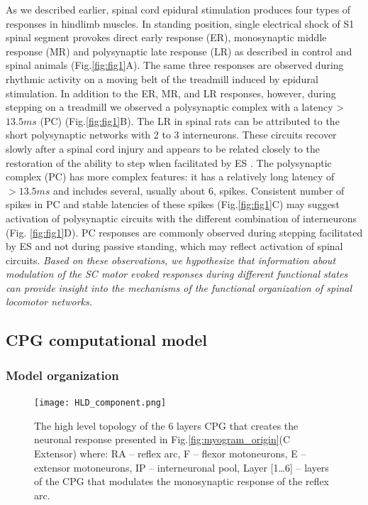 \documentclass[]{elsarticle}
\begin{document}
As we described earlier, spinal cord epidural stimulation produces four types of responses in hindlimb muscles. In standing position, single electrical shock of S1 spinal segment provokes direct early response (ER), monosynaptic middle response (MR) and polysynaptic late response (LR) as described in control \cite{gerasimenko2006spinal} and spinal \cite{lavrov_plasticity_2006} animals (Fig.\ref{fig:fig1}A). The same three responses are observed during rhythmic activity on a moving belt of the treadmill induced by epidural stimulation. In addition to the ER, MR, and LR responses, however, during stepping on a treadmill we observed a polysynaptic complex with a latency > $13.5 ms$ (PC) (Fig.\ref{fig:fig1}B). The LR in spinal rats can be attributed to the short polysynaptic networks with 2 to 3 interneurons. These circuits recover slowly after a spinal cord injury and appears to be related closely to the restoration of the ability to step when facilitated by ES \cite{lavrov_plasticity_2006}. The polysynaptic complex (PC) has more complex features: it has a relatively long latency of $>13.5ms$ and includes several, usually about 6, spikes. Consistent number of spikes in PC and stable latencies of these spikes (Fig.\ref{fig:fig1}C) may suggest activation of polysynaptic circuits with the different combination of interneurons (Fig. \ref{fig:fig1}D). PC responses are commonly observed during stepping facilitated by ES and not during passive standing, which may reflect activation of spinal circuits. \emph{ Based on these observations, we hypothesize that information about modulation of the SC motor evoked responses during different functional states can provide insight into the mechanisms of the functional organization of spinal locomotor networks.}

\subsection{CPG computational model}

\subsubsection{Model organization} 


\begin{figure}[ht!]
	\centering
	\texttt{[image: HLD\_component.png]}
	\caption{The high level topology of the 6 layers CPG that creates the neuronal response presented in Fig.\ref{fig:myogram_origin}(C Extensor) where:  
    RA -- reflex arc,  
    F -- flexor motoneurons,  
    E -- extensor motoneurons, 
    IP -- interneuronal pool, 
    Layer [1\ldots{}6] -- layers of the CPG that modulates the monosynaptic response of the reflex arc.}
    \label{fig:HLD}
\end{figure}
\end{document}

